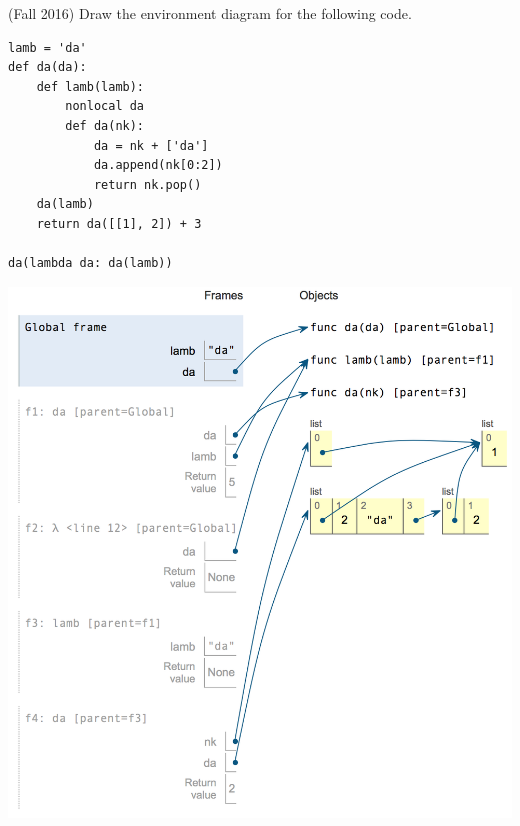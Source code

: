 \question
(Fall 2016) Draw the environment diagram for the following code.

\begin{minipage}{\textwidth}
\begin{lstlisting}
lamb = 'da'
def da(da):
    def lamb(lamb):
        nonlocal da
        def da(nk):
            da = nk + ['da']
            da.append(nk[0:2])
            return nk.pop()
    da(lamb)
    return da([[1], 2]) + 3

da(lambda da: da(lamb))
\end{lstlisting}
\end{minipage}

\begin{solution}[0.5in]
\begin{center}
\includegraphics[scale=.5]{dalamb.png}
\end{center}
\end{solution}
